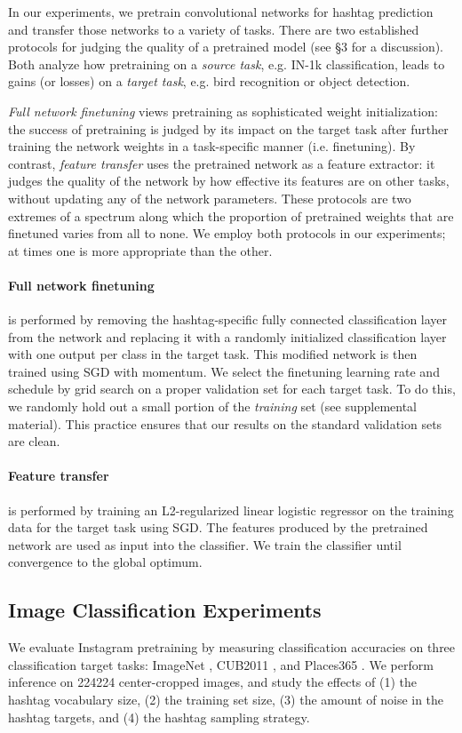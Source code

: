 \documentclass[runningheads]{llncs}
\makeatletter
\newcommand{\eg}{e.g.\@\xspace}
\newcommand{\ie}{i.e.\@\xspace}
\makeatother
\begin{document}
In our experiments, we pretrain convolutional networks for hashtag prediction and transfer those networks to a variety of tasks. There are two established protocols for judging the quality of a pretrained model (see \cite{pathak2016motion} \S3 for a discussion). Both analyze how pretraining on a \emph{source task}, \eg IN-1k classification, leads to gains (or losses) on a \emph{target task}, \eg bird recognition or object detection.

\emph{Full network finetuning} views pretraining as sophisticated weight initialization: the success of pretraining is judged by its impact on the target task after further training the network weights in a task-specific manner (\ie finetuning). By contrast, \emph{feature transfer} uses the pretrained network as a feature extractor: it judges the quality of the network by how effective its features are on other tasks, without updating any of the network parameters. These protocols are two extremes of a spectrum along which the proportion of pretrained weights that are finetuned varies from all to none. We employ both protocols in our experiments; at times one is more appropriate than the other.

\paragraph{Full network finetuning} is performed by removing the hashtag-specific fully connected classification layer from the network and replacing it with a randomly initialized classification layer with one output per class in the target task. This modified network is then trained using SGD with momentum. We select the finetuning learning rate and schedule by grid search on a proper validation set for each target task. To do this, we randomly hold out a small portion of the \emph{training} set (see supplemental material). This practice ensures that our results on the standard validation sets are clean.

\paragraph{Feature transfer} is performed by training an L2-regularized linear logistic regressor on the training data for the target task using SGD. The features produced by the pretrained network are used as input into the classifier. We train the classifier until convergence to the global optimum.

\subsection{Image Classification Experiments}
We evaluate Instagram pretraining by measuring classification accuracies on three classification target tasks: ImageNet \cite{deng2009imagenet}, CUB2011 \cite{welinder2010birds}, and Places365 \cite{zhou2017places}. We perform inference on 224224 center-cropped images, and study the effects of (1) the hashtag vocabulary size, (2) the training set size, (3) the amount of noise in the hashtag targets, and (4) the hashtag sampling strategy.
\end{document}
